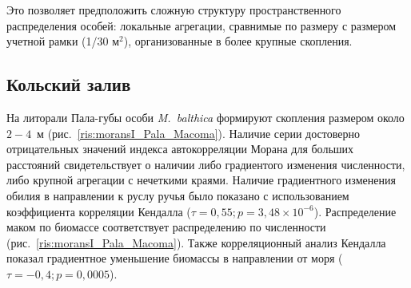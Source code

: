 %
Это позволяет предположить сложную структуру пространственного распределения особей: локальные агрегации, сравнимые по размеру с размером учетной рамки (1/30 м$^2$), организованные в более крупные скопления. 


	\subsection{Кольский залив}
На литорали Пала-губы особи {\it M.~balthica} формируют скопления размером около $2-4$~м (рис.~\ref{ris:moransI_Pala_Macoma}). 
Наличие серии достоверно отрицательных значений индекса автокорреляции Морана для больших расстояний свидетельствует о наличии либо градиентого изменения численности, либо крупной агрегации с нечеткими краями.
Наличие градиентного изменения обилия в направлении к руслу ручья было показано с использованием коэффициента корреляции Кендалла ($\tau = 0,55; p = 3,48 \times 10^{-6}$).
Распределение маком по биомассе соответствует распределению по численности (рис.~\ref{ris:moransI_Pala_Macoma}). Также корреляционный анализ Кендалла показал градиентное уменьшение биомассы в направлении от моря ($\tau = -0,4; p = 0,0005$).
